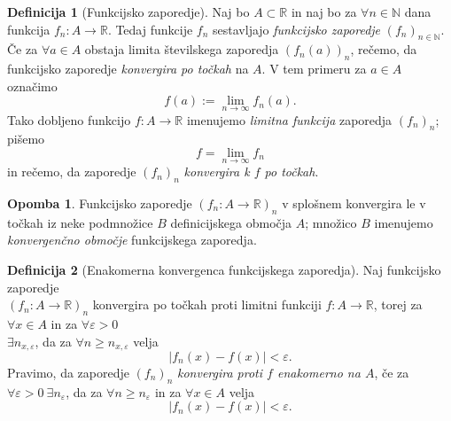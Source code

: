 \documentclass[11pt]{article}
\theoremstyle{definition}
\newtheorem{definicija}{Definicija}[section]
\theoremstyle{definition}
\theoremstyle{definition}
\theoremstyle{theorem}
\newtheorem*{opomba}{Opomba}
\begin{document}
\begin{definicija}[Funkcijsko zaporedje]

Naj bo $A \subset \mathbb{R}$ in naj bo za $\forall n \in \mathbb{N}$ dana funkcija $f_n: A \rightarrow \mathbb{R}$. Tedaj funkcije $f_n$ sestavljajo \textit{funkcijsko zaporedje} $(f_n)_{n \in \mathbb{N}}$. \\

Če za $\forall a \in A$ obstaja limita številskega zaporedja $(f_n(a))_n$, rečemo, da funkcijsko zaporedje \textit{konvergira po točkah} na $A$. V tem primeru za $a \in A$ označimo 
$$f(a) := \lim_{n \rightarrow \infty} f_n(a).$$
Tako dobljeno funkcijo $f: A \rightarrow \mathbb{R}$ imenujemo \textit{limitna funkcija} zaporedja $(f_n)_n$; pišemo 
$$f = \lim_{n \rightarrow \infty} f_n$$
in rečemo, da zaporedje $(f_n)_n$ \textit{konvergira k $f$ po točkah}.

\end{definicija}
\vspace{0.5cm}

\begin{opomba}

Funkcijsko zaporedje $(f_n: A \rightarrow \mathbb{R})_n$ v splošnem konvergira le v točkah iz neke podmnožice $B$ definicijskega območja $A$; množico $B$ imenujemo \textit{konvergenčno območje} funkcijskega zaporedja.

\end{opomba}
\vspace{0.5cm}

\begin{definicija}[Enakomerna konvergenca funkcijskega zaporedja]

Naj funkcijsko zaporedje \\ $(f_n: A \rightarrow \mathbb{R})_n$ konvergira po točkah proti limitni funkciji $f: A \rightarrow \mathbb{R}$, torej za $\forall x \in A$ in za $\forall \varepsilon > 0$ \\ $\exists n_{x,\varepsilon}$, da za $\forall n \geq n_{x,\varepsilon}$ velja 
$$|f_n(x) - f(x)| < \varepsilon.$$
Pravimo, da zaporedje $(f_n)_n$ \textit{konvergira proti $f$ enakomerno na $A$}, če za $\forall  \varepsilon > 0 ~\exists n_{\varepsilon}$, da za $\forall n \geq n_{\varepsilon}$ in za $\forall x \in A$ velja
$$|f_n(x) - f(x)| < \varepsilon.$$

\end{definicija}
\vspace{0.5cm}
\end{document}
